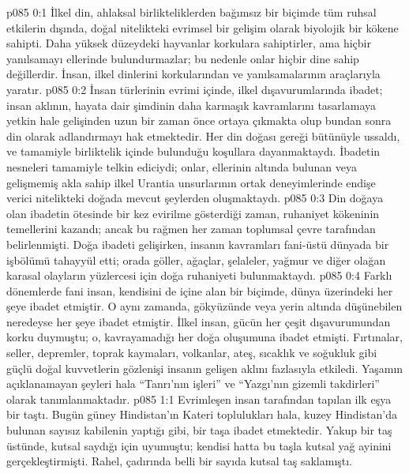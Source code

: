 \vs p085 0:1 İlkel din, ahlaksal birlikteliklerden bağımsız bir biçimde tüm ruhsal etkilerin dışında, doğal nitelikteki evrimsel bir gelişim olarak biyolojik bir kökene sahipti. Daha yüksek düzeydeki hayvanlar korkulara sahiptirler, ama hiçbir yanılsamayı ellerinde bulundurmazlar; bu nedenle onlar hiçbir dine sahip değillerdir. İnsan, ilkel dinlerini korkularından ve yanılsamalarının araçlarıyla yaratır.
\vs p085 0:2 İnsan türlerinin evrimi içinde, ilkel dışavurumlarında ibadet; insan aklının, hayata dair şimdinin daha karmaşık kavramlarını tasarlamaya yetkin hale gelişinden uzun bir zaman önce ortaya çıkmakta olup bundan sonra din olarak adlandırmayı hak etmektedir. Her din doğası gereği bütünüyle ussaldı, ve tamamiyle birliktelik içinde bulunduğu koşullara dayanmaktaydı. İbadetin nesneleri tamamiyle telkin ediciydi; onlar, ellerinin altında bulunan veya gelişmemiş akla sahip ilkel Urantia unsurlarının ortak deneyimlerinde endişe verici nitelikteki doğada mevcut şeylerden oluşmaktaydı.
\vs p085 0:3 Din doğaya olan ibadetin ötesinde bir kez evirilme gösterdiği zaman, ruhaniyet kökeninin temellerini kazandı; ancak bu rağmen her zaman toplumsal çevre tarafından belirlenmişti. Doğa ibadeti gelişirken, insanın kavramları fani\hyp{}üstü dünyada bir işbölümü tahayyül etti; orada göller, ağaçlar, şelaleler, yağmur ve diğer olağan karasal olayların yüzlercesi için doğa ruhaniyeti bulunmaktaydı.
\vs p085 0:4 Farklı dönemlerde fani insan, kendisini de içine alan bir biçimde, dünya üzerindeki her şeye ibadet etmiştir. O aynı zamanda, gökyüzünde veya yerin altında düşünebilen neredeyse her şeye ibadet etmiştir. İlkel insan, gücün her çeşit dışavurumundan korku duymuştu; o, kavrayamadığı her doğa oluşumuna ibadet etmişti. Fırtınalar, seller, depremler, toprak kaymaları, volkanlar, ateş, sıcaklık ve soğukluk gibi güçlü doğal kuvvetlerin gözlenişi insanın gelişen aklını fazlasıyla etkiledi. Yaşamın açıklanamayan şeyleri hala “Tanrı’nın işleri” ve “Yazgı’nın gizemli takdirleri” olarak tanımlanmaktadır.
\vs p085 1:1 Evrimleşen insan tarafından tapılan ilk eşya bir taştı. Bugün güney Hindistan’ın Kateri toplulukları hala, kuzey Hindistan’da bulunan sayısız kabilenin yaptığı gibi, bir taşa ibadet etmektedir. Yakup bir taş üstünde, kutsal saydığı için uyumuştu; kendisi hatta bu taşla kutsal yağ ayinini gerçekleştirmişti. Rahel, çadırında belli bir sayıda kutsal taş saklamıştı.
